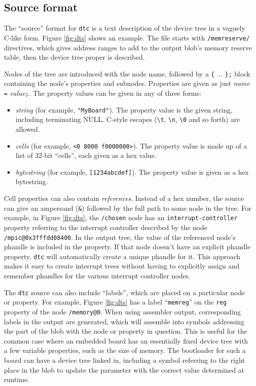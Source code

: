 \documentclass[a4paper,twocolumn]{article}
\newcommand{\dtc}{\texttt{dtc}\xspace}
\begin{document}
\subsection{Source format}
\label{sec:dts}

The ``source'' format for \dtc is a text description of the device
tree in a vaguely C-like form.  Figure \ref{fig:dts} shows an
example.  The file starts with \texttt{/memreserve/} directives, which
gives address ranges to add to the output blob's memory reserve table,
then the device tree proper is described.

Nodes of the tree are introduced with the node name, followed by a
\texttt{\{} ... \texttt{\};} block containing the node's properties
and subnodes.  Properties are given as just {\emph{name} \texttt{=}
  \emph{value}\texttt{;}}.  The property values can be given in any
of three forms:
\begin{itemize}
\item \emph{string} (for example, \texttt{"MyBoard"}).  The property
  value is the given string, including terminating NULL.  C-style
  escapes (\verb+\t+, \verb+\n+, \verb+\0+ and so forth) are allowed.
\item \emph{cells} (for example, \texttt{<0 8000 f0000000>}).  The
  property value is made up of a list of 32-bit ``cells'', each given
  as a hex value.
\item \emph{bytestring} (for example, \texttt{[1234abcdef]}).  The
  property value is given as a hex bytestring.
\end{itemize}

Cell properties can also contain \emph{references}.  Instead of a hex
number, the source can give an ampersand (\texttt{\&}) followed by the
full path to some node in the tree.  For example, in Figure
\ref{fig:dts}, the \texttt{/chosen} node has an
\texttt{interrupt-controller} property referring to the interrupt
controller described by the node \texttt{/mpic@0x3fffdd08400}.  In the
output tree, the value of the referenced node's phandle is included in
the property.  If that node doesn't have an explicit phandle property,
\dtc will automatically create a unique phandle for it.  This approach
makes it easy to create interrupt trees without having to explicitly
assign and remember phandles for the various interrupt controller
nodes.

The \dtc source can also include ``labels'', which are placed on a
particular node or property.  For example, Figure \ref{fig:dts} has a
label ``\texttt{memreg}'' on the \texttt{reg} property of the node
\texttt{/memory@0}.  When using assembler output, corresponding labels
in the output are generated, which will assemble into symbols
addressing the part of the blob with the node or property in question.
This is useful for the common case where an embedded board has an
essentially fixed device tree with a few variable properties, such as
the size of memory.  The bootloader for such a board can have a device
tree linked in, including a symbol referring to the right place in the
blob to update the parameter with the correct value determined at
runtime.
\end{document}
